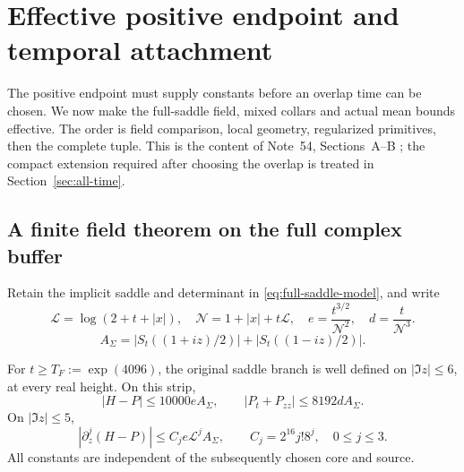 \section{Effective positive endpoint and temporal attachment}
\label{sec:effective-positive}
The positive endpoint must supply constants before an overlap time can
be chosen. We now make the full-saddle field, mixed collars and actual
mean bounds effective. The order is field comparison, local geometry,
regularized primitives, then the complete tuple. This is the content of
Note~54, Sections~A--B \cite{n54}; the compact extension required after
choosing the overlap is treated in Section~\ref{sec:all-time}.

\subsection{A finite field theorem on the full complex buffer}
Retain the implicit saddle and determinant in
\eqref{eq:full-saddle-model}, and write
\[
 \mathcal L=\log(2+t+|x|),\quad \mathcal N=1+|x|+t\mathcal L,
 \quad e=\frac{t^{3/2}}{\mathcal N^2},\quad d=\frac{t}{\mathcal N^3}.
\]
\[
 A_\Sigma=|S_t((1+iz)/2)|+|S_t((1-iz)/2)|.
\]
\begin{theorem}
\label{thm:effective-positive-field}
For $t\ge T_F:=\exp(4096)$, the original saddle branch is well defined
on $|\Im z|\le6$, at every real height. On this strip,
\[
 |H-P|\le10000e A_\Sigma,\qquad
 |P_t+P_{zz}|\le8192d A_\Sigma.
\]
On $|\Im z|\le5$,
\begin{equation}
 |\partial_z^j(H-P)|\le C_j e\mathcal L^j A_\Sigma,
 \qquad C_j=2^{16}j!8^j,\quad 0\le j\le3.
 \label{eq:ep-field}
\end{equation}
All constants are independent of the subsequently chosen core and source.
\end{theorem}

